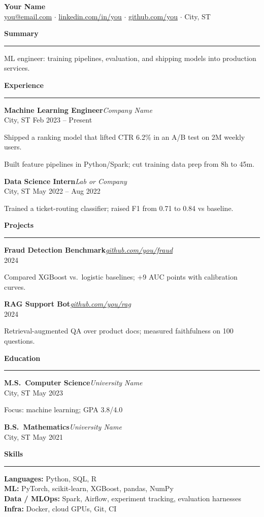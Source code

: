 \documentclass[11pt,letterpaper]{article}
\newcommand{\resumesection}[1]{%
  \par\vspace{0.65em}%
  {\large\bfseries\color{accent}#1}\par
  \vspace{-0.35em}%
  \textcolor{accent}{\rule{\textwidth}{0.55pt}}\par
  \vspace{0.3em}%
}
\newcommand{\role}[3]{%
  \noindent\textbf{#1}\hfill\textit{#2}\\
  \textcolor{muted}{\small #3}\par\vspace{0.12em}
}
\newenvironment{resumeitemize}{%
  \begin{list}{\textbullet}{%
    \setlength{\leftmargin}{1.1em}%
    \setlength{\itemsep}{0.12em}%
    \setlength{\parsep}{0pt}%
    \setlength{\topsep}{0.15em}%
    \setlength{\partopsep}{0pt}%
  }%
}{\end{list}}
\newcommand{\entrygap}{\vspace{0.45em}}
\begin{document}
\begin{center}
  {\LARGE\bfseries Your Name}\\[0.3em]
  {\small
    \href{mailto:you@email.com}{you@email.com}
    $\cdot$ \href{https://linkedin.com/in/you}{linkedin.com/in/you}
    $\cdot$ \href{https://github.com/you}{github.com/you}
    $\cdot$ City, ST
  }
\end{center}

\resumesection{Summary}
ML engineer: training pipelines, evaluation, and shipping models into production services.

\resumesection{Experience}
\role{Machine Learning Engineer}{Company Name}{City, ST \quad Feb 2023 -- Present}
\begin{resumeitemize}
  \item Shipped a ranking model that lifted CTR 6.2\% in an A/B test on 2M weekly users.
  \item Built feature pipelines in Python/Spark; cut training data prep from 8h to 45m.
\end{resumeitemize}
\entrygap
\role{Data Science Intern}{Lab or Company}{City, ST \quad May 2022 -- Aug 2022}
\begin{resumeitemize}
  \item Trained a ticket-routing classifier; raised F1 from 0.71 to 0.84 vs baseline.
\end{resumeitemize}

\resumesection{Projects}
\role{Fraud Detection Benchmark}{\href{https://github.com/you/fraud}{github.com/you/fraud}}{2024}
\begin{resumeitemize}
  \item Compared XGBoost vs.\ logistic baselines; +9 AUC points with calibration curves.
\end{resumeitemize}
\entrygap
\role{RAG Support Bot}{\href{https://github.com/you/rag}{github.com/you/rag}}{2024}
\begin{resumeitemize}
  \item Retrieval-augmented QA over product docs; measured faithfulness on 100 questions.
\end{resumeitemize}

\resumesection{Education}
\role{M.S.\ Computer Science}{University Name}{City, ST \quad May 2023}
\begin{resumeitemize}
  \item Focus: machine learning; GPA 3.8/4.0
\end{resumeitemize}
\entrygap
\role{B.S.\ Mathematics}{University Name}{City, ST \quad May 2021}

\resumesection{Skills}
\noindent\textbf{Languages:} Python, SQL, R\\
\textbf{ML:} PyTorch, scikit-learn, XGBoost, pandas, NumPy\\
\textbf{Data / MLOps:} Spark, Airflow, experiment tracking, evaluation harnesses\\
\textbf{Infra:} Docker, cloud GPUs, Git, CI
\end{document}
